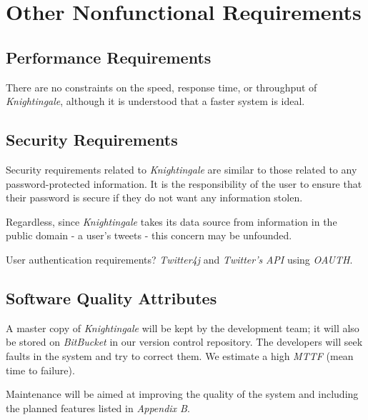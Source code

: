 \documentclass[a4paper, 12pt]{article}
\begin{document}
\section{Other Nonfunctional Requirements} \label{sec:nonfunc}
\subsection{Performance Requirements} \label{sec:performance}
\begin{adjustwidth}{2em}{0pt}
There are no constraints on the speed, response time, or throughput of \textit{Knightingale}, although it is understood that a faster system is ideal.
\end{adjustwidth}

\subsection{Security Requirements} \label{sec:security}
\begin{adjustwidth}{2em}{0pt}
Security requirements related to \textit{Knightingale} are similar to those related to any password-protected information. It is the responsibility of the user to ensure that their password is secure if they do not want any information stolen. \newline

\noindent Regardless, since \textit{Knightingale} takes its data source from information in the public domain - a user's tweets - this concern may be unfounded. \newline

\noindent User authentication requirements? \newline
\noindent \textit{Twitter4j} and \textit{Twitter's} \textit{API} using \textit{OAUTH}.
\end{adjustwidth} 

\subsection{Software Quality Attributes} \label{sec:quality}
\begin{adjustwidth}{2em}{0pt}
A master copy of \textit{Knightingale} will be kept by the development team; it will also be stored on \textit{BitBucket} in our version control repository. The developers will seek faults in the system and try to correct them. We estimate a high \textit{MTTF} (mean time to failure). \newline

\noindent Maintenance will be aimed at improving the quality of the system and including the planned features listed in \textit{Appendix B}.
\end{adjustwidth}
\end{document}
